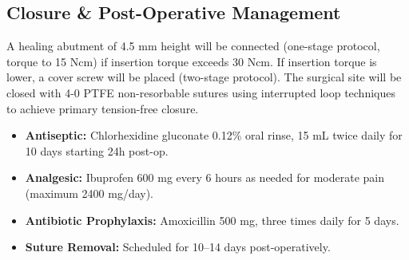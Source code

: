 \subsection{Closure \& Post-Operative Management}
A healing abutment of 4.5 mm height will be connected (one-stage protocol, torque to 15 Ncm) if insertion torque exceeds 30 Ncm. If insertion torque is lower, a cover screw will be placed (two-stage protocol).
The surgical site will be closed with 4-0 PTFE non-resorbable sutures using interrupted loop techniques to achieve primary tension-free closure.

\vspace{0.3cm}

\begin{tcolorbox}[surgicalbox, title=Post-Surgical Pharmacotherapy]
    \begin{itemize}[leftmargin=*, noitemsep]
        \item \textbf{Antiseptic:} Chlorhexidine gluconate 0.12\% oral rinse, 15 mL twice daily for 10 days starting 24h post-op.
        \item \textbf{Analgesic:} Ibuprofen 600 mg every 6 hours as needed for moderate pain (maximum 2400 mg/day).
        \item \textbf{Antibiotic Prophylaxis:} Amoxicillin 500 mg, three times daily for 5 days.
        \item \textbf{Suture Removal:} Scheduled for 10--14 days post-operatively.
    \end{itemize}
\end{tcolorbox}
